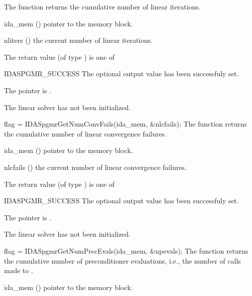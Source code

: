 {{}
{
  The function  returns the
  cumulative number of linear iterations.
}
{
  \begin{args}[nliters]
  \item[ida\_mem] ()
    pointer to the {\ida} memory block.
  \item[nliters] ()
    the current number of linear iterations.
  \end{args}
}
{
  The return value  (of type ) is one of
  \begin{args}
  \item[IDASPGMR\_SUCCESS] 
    The optional output value has been successfuly set.
  \item[\Id{IDASPGMR\_MEM\_NULL}]
    The  pointer is .
  \item[\Id{IDASPGMR\_LMEM\_NULL}]
    The {\idaspgmr} linear solver has not been initialized.
  \end{args}
}
{}
{
  flag = IDASpgmrGetNumConvFails(ida\_mem, \&nlcfails);
}
{
  The function  returns the
  cumulative number of linear convergence failures.
}
{
  \begin{args}[nlcfails]
  \item[ida\_mem] ()
    pointer to the {\ida} memory block.
  \item[nlcfails] ()
    the current number of linear convergence failures.
  \end{args}
}
{
  The return value  (of type ) is one of
  \begin{args}
  \item[IDASPGMR\_SUCCESS] 
    The optional output value has been successfuly set.
  \item[\Id{IDASPGMR\_MEM\_NULL}]
    The  pointer is .
  \item[\Id{IDASPGMR\_LMEM\_NULL}]
    The {\idaspgmr} linear solver has not been initialized.
  \end{args}
}
{}
{
  flag = IDASpgmrGetNumPrecEvals(ida\_mem, \&npevals);
}
{
  The function  returns the
  cumulative number of preconditioner evaluations, i.e., the number of 
  calls made to .
}
{
  \begin{args}[npevals]
  \item[ida\_mem] ()
    pointer to the {\ida} memory block.

\end{args}}}
